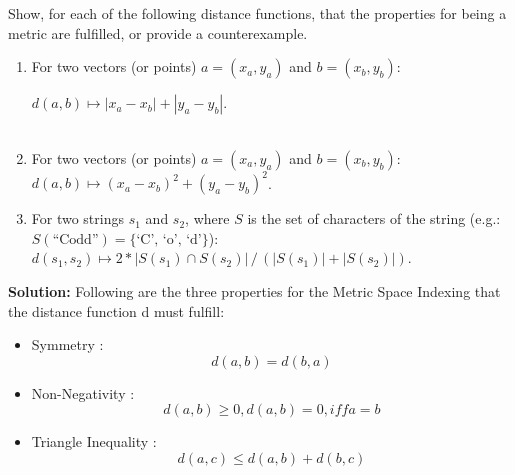 Show, for each of the following distance functions, that the properties for being a metric are fulfilled, or provide a counterexample.
    \begin{enumerate}

   \item\label{l1} 
   For two vectors (or points) $a=(x_a, y_a)$ and $b=(x_b, y_b)$:

 $d(a, b) \mapsto | x_a - x_b | + | y_a - y_b |$.  \\\\

  \item\label{l2} 
For two vectors (or points) $a=(x_a, y_a)$ and $b=(x_b, y_b)$:
 $d(a, b) \mapsto ( x_a - x_b )^2 + ( y_a - y_b )^2$.

      \item\label{l3} 
      For two strings $s_1$ and $s_2$, where $S$ is the set of characters of the string (e.g.: $S(\text{``Codd''}) = \{\text{`C', `o', `d'}\}$):
      $d(s_1, s_2) \mapsto 2* |S(s_1) \cap S(s_2)| \, / \, (|S(s_1)| + |S(s_2)|)$.\\

    \end{enumerate}
    {\bf Solution:}
    Following are the three properties for the Metric Space Indexing that the distance function d must fulfill:
 \begin{itemize}
     \item Symmetry : \[d(a,b) = d(b,a) \]
     \item Non-Negativity : \[d(a,b) \ge 0 , d(a,b) = 0, iff a = b\]
     \item Triangle Inequality : \[d(a,c) \leq d(a,b) + d(b,c) \]
 \end{itemize}
